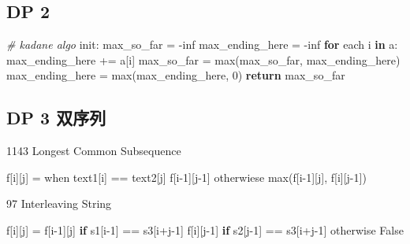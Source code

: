 \documentclass[
]{article}
\newenvironment{Shaded}{}{}
\newcommand{\BuiltInTok}[1]{#1}
\newcommand{\CommentTok}[1]{\textcolor[rgb]{0.38,0.63,0.69}{\textit{#1}}}
\newcommand{\ControlFlowTok}[1]{\textcolor[rgb]{0.00,0.44,0.13}{\textbf{#1}}}
\newcommand{\DecValTok}[1]{\textcolor[rgb]{0.25,0.63,0.44}{#1}}
\newcommand{\KeywordTok}[1]{\textcolor[rgb]{0.00,0.44,0.13}{\textbf{#1}}}
\newcommand{\NormalTok}[1]{#1}
\newcommand{\OperatorTok}[1]{\textcolor[rgb]{0.40,0.40,0.40}{#1}}
\newcommand{\VariableTok}[1]{\textcolor[rgb]{0.10,0.09,0.49}{#1}}
\begin{document}
\hypertarget{dp-2}{%
\subsection{DP 2}\label{dp-2}}

\begin{Shaded}
\begin{Highlighting}[]
\CommentTok{\# kadane algo}
\NormalTok{init:}
\NormalTok{  max\_so\_far }\OperatorTok{=} \OperatorTok{{-}}\NormalTok{inf}
\NormalTok{ 	max\_ending\_here }\OperatorTok{=} \OperatorTok{{-}}\NormalTok{inf}
\ControlFlowTok{for}\NormalTok{ each i }\KeywordTok{in}\NormalTok{ a:}
\NormalTok{  max\_ending\_here }\OperatorTok{+=}\NormalTok{ a[i]}
\NormalTok{  max\_so\_far }\OperatorTok{=} \BuiltInTok{max}\NormalTok{(max\_so\_far, max\_ending\_here)}
\NormalTok{  max\_ending\_here }\OperatorTok{=} \BuiltInTok{max}\NormalTok{(max\_ending\_here, }\DecValTok{0}\NormalTok{)}
\ControlFlowTok{return}\NormalTok{ max\_so\_far}
\end{Highlighting}
\end{Shaded}

\hypertarget{dp-3-ux53ccux5e8fux5217}{%
\subsection{DP 3 双序列}\label{dp-3-ux53ccux5e8fux5217}}

1143 Longest Common Subsequence

\begin{Shaded}
\begin{Highlighting}[]
\NormalTok{f[i][j] }\OperatorTok{=}
\NormalTok{					when text1[i] }\OperatorTok{==}\NormalTok{ text2[j]		f[i}\OperatorTok{{-}}\DecValTok{1}\NormalTok{][j}\OperatorTok{{-}}\DecValTok{1}\NormalTok{]}
\NormalTok{  				otherwiese									}\BuiltInTok{max}\NormalTok{(f[i}\OperatorTok{{-}}\DecValTok{1}\NormalTok{][j], f[i][j}\OperatorTok{{-}}\DecValTok{1}\NormalTok{])}
\end{Highlighting}
\end{Shaded}

97 Interleaving String

\begin{Shaded}
\begin{Highlighting}[]
\NormalTok{f[i][j] }\OperatorTok{=}\NormalTok{  	f[i}\OperatorTok{{-}}\DecValTok{1}\NormalTok{][j] }\ControlFlowTok{if}\NormalTok{ 	s1[i}\OperatorTok{{-}}\DecValTok{1}\NormalTok{] }\OperatorTok{==}\NormalTok{ s3[i}\OperatorTok{+}\NormalTok{j}\OperatorTok{{-}}\DecValTok{1}\NormalTok{]}
\NormalTok{						f[i][j}\OperatorTok{{-}}\DecValTok{1}\NormalTok{] }\ControlFlowTok{if}\NormalTok{ 	s2[j}\OperatorTok{{-}}\DecValTok{1}\NormalTok{] }\OperatorTok{==}\NormalTok{ s3[i}\OperatorTok{+}\NormalTok{j}\OperatorTok{{-}}\DecValTok{1}\NormalTok{]}
\NormalTok{  					otherwise			}\VariableTok{False}
\end{Highlighting}
\end{Shaded}
\end{document}

